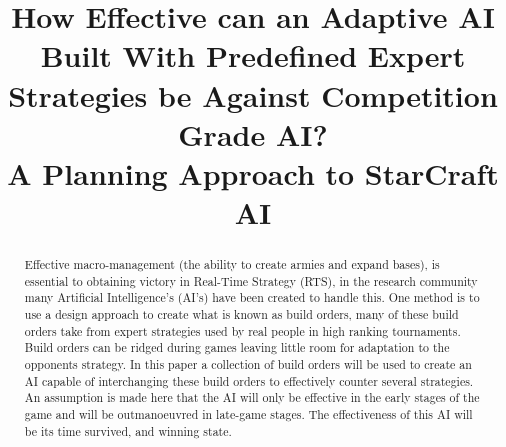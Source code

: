 \documentclass[journal]{IEEEtran}
\begin{document}
%
\title{%
	How Effective can an Adaptive AI Built With Predefined Expert Strategies be Against Competition Grade AI? \\
	\large A Planning Approach to StarCraft AI}

%
%
\author{
}


\maketitle

\begin{abstract}
Effective macro-management (the ability to create armies and expand bases), is essential to obtaining victory in Real-Time Strategy (RTS), in the research community many Artificial Intelligence's (AI's) have been created to handle this. One method is to use a design approach to create what is known as build orders, many of these build orders take from expert strategies used by real people in high ranking tournaments. Build orders can be ridged during games leaving little room for adaptation to the opponents strategy. In this paper a collection of build orders will be used to create an AI capable of interchanging these build orders to effectively counter several strategies. An assumption is made here that the AI will only be effective in the early stages of the game and will be outmanoeuvred in late-game stages. The effectiveness of this AI will be its time survived, and winning state.
\end{abstract}
\end{document}
